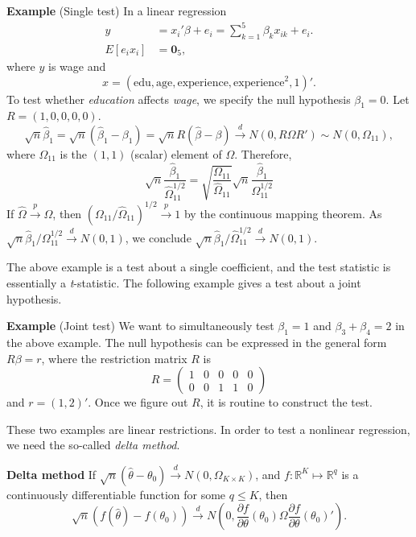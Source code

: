 \documentclass[11pt]{article}
\begin{document}
    \textbf{Example} (Single test) In a linear regression \[\begin{aligned}
y & =  x_{i}'\beta+e_{i}=\sum_{k=1}^{5}\beta_{k}x_{ik}+e_{i}.\nonumber \\
E\left[e_{i}x_{i}\right] & =  \mathbf{0}_{5},\label{eq:example}\end{aligned}
\] where \(y\) is wage and
\[x=\left(\mbox{edu},\mbox{age},\mbox{experience},\mbox{experience}^{2},1\right)'.\]
To test whether \emph{education} affects \emph{wage}, we specify the
null hypothesis \(\beta_{1}=0\). Let \(R=\left(1,0,0,0,0\right)\).
\[\sqrt{n}\widehat{\beta}_{1}=\sqrt{n}\left(\widehat{\beta}_{1}-\beta_{1}\right)=\sqrt{n}R\left(\widehat{\beta}-\beta\right)\stackrel{d}{\to}N\left(0,R\Omega R'\right)\sim N\left(0,\Omega_{11}\right),\label{eq:R11}\]
where \(\Omega{}_{11}\) is the \(\left(1,1\right)\) (scalar) element of
\(\Omega\). Therefore,
\[\sqrt{n}\frac{\widehat{\beta}_{1}}{\widehat{\Omega}_{11}^{1/2}}=\sqrt{\frac{\Omega_{11}}{\widehat{\Omega}_{11}}}\sqrt{n}\frac{\widehat{\beta}_{1}}{\Omega_{11}^{1/2}}\]
If \(\widehat{\Omega}\stackrel{p}{\to}\Omega\), then
\(\left(\Omega_{11}/\widehat{\Omega}_{11}\right)^{1/2}\stackrel{p}{\to}1\)
by the continuous mapping theorem. As
\(\sqrt{n}\widehat{\beta}_{1}/\Omega_{11}^{1/2}\stackrel{d}{\to}N\left(0,1\right)\),
we conclude
\(\sqrt{n}\widehat{\beta}_{1}/\widehat{\Omega}_{11}^{1/2}\stackrel{d}{\to}N\left(0,1\right).\)

    The above example is a test about a single coefficient, and the test
statistic is essentially a \emph{t}-statistic. The following example
gives a test about a joint hypothesis.

\textbf{Example} (Joint test) We want to simultaneously test
\(\beta_{1}=1\) and \(\beta_{3}+\beta_{4}=2\) in the above example. The
null hypothesis can be expressed in the general form \(R\beta=r\), where
the restriction matrix \(R\) is \[R=\begin{pmatrix}1 & 0 & 0 & 0 & 0\\
0 & 0 & 1 & 1 & 0
\end{pmatrix}\] and \(r=\left(1,2\right)'\). Once we figure out \(R\),
it is routine to construct the test.

    These two examples are linear restrictions. In order to test a nonlinear
regression, we need the so-called \emph{delta method}.

\textbf{Delta method} If
\(\sqrt{n}\left(\widehat{\theta}-\theta_{0}\right)\stackrel{d}{\to}N\left(0,\Omega_{K\times K}\right)\),
and \(f:\mathbb{R}^{K}\mapsto\mathbb{R}^{q}\) is a continuously
differentiable function for some \(q\leq K\), then
\[\sqrt{n}\left(f\left(\widehat{\theta}\right)-f\left(\theta_{0}\right)\right)\stackrel{d}{\to}N\left(0,\frac{\partial f}{\partial\theta}\left(\theta_{0}\right)\Omega\frac{\partial f}{\partial\theta}\left(\theta_{0}\right)'\right).\]
\end{document}
